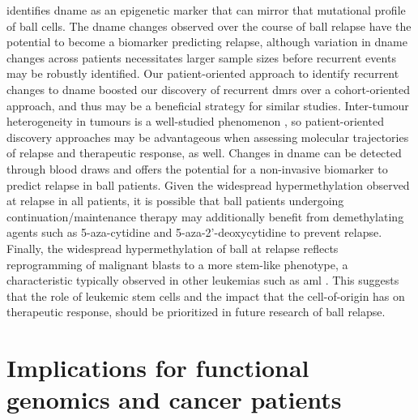  identifies \gls{dname} as an epigenetic marker that can mirror that mutational profile of \gls{ball} cells.
The \gls{dname} changes observed over the course of \gls{ball} relapse have the potential to become a biomarker predicting relapse, although variation in \gls{dname} changes across patients necessitates larger sample sizes before recurrent events may be robustly identified.
Our patient-oriented approach to identify recurrent changes to \gls{dname} boosted our discovery of recurrent \glspl{dmr} over a cohort-oriented approach, and thus may be a beneficial strategy for similar studies.
Inter-tumour heterogeneity in tumours is a well-studied phenomenon \cite{marusykTumorHeterogeneityCauses2010,sottorivaCatchMyDrift2017,huangGeneticNongeneticInstability2013,mcgranahanBiologicalTherapeuticImpact2015,landauChronicLymphocyticLeukemia2013,ben-davidGeneticTranscriptionalEvolution2018,carterEpigeneticBasisCellular2021}, so patient-oriented discovery approaches may be advantageous when assessing molecular trajectories of relapse and therapeutic response, as well.
Changes in \gls{dname} can be detected through blood draws \cite{peterDynamicsCellfreeDNA2020,shenSensitiveTumourDetection2018,nassiriDetectionDiscriminationIntracranial2020} and offers the potential for a non-invasive biomarker to predict relapse in \gls{ball} patients.
Given the widespread hypermethylation observed at relapse in all patients, it is possible that \gls{ball} patients undergoing continuation/maintenance therapy may additionally benefit from demethylating agents such as 5-aza-cytidine and 5-aza-2'-deoxycytidine to prevent relapse.
Finally, the widespread hypermethylation of \gls{ball} at relapse reflects reprogramming of malignant blasts to a more stem-like phenotype, a characteristic typically observed in other leukemias such as \gls{aml} \cite{krivtsovMLLTranslocationsHistone2007,liClinicalImplicationsGenomewide2017,kresoEvolutionCancerStem2014,shlushIdentificationPreleukaemicHaematopoietic2014,shlushTracingOriginsRelapse2017}.
This suggests that the role of leukemic stem cells and the impact that the cell-of-origin has on therapeutic response, should be prioritized in future research of \gls{ball} relapse.

\section{Implications for functional genomics and cancer patients}


